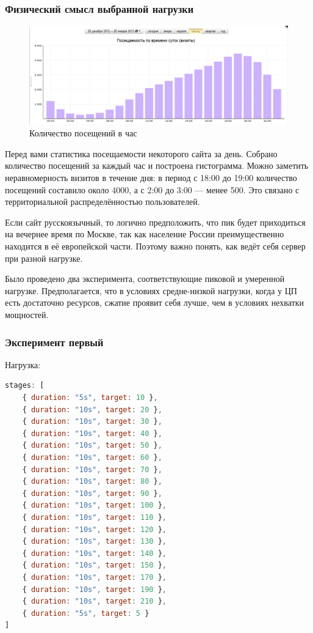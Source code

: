 \documentclass[12pt]{article}
\begin{document}
\subsubsection{Физический смысл выбранной нагрузки}

\begin{figure}[H]
    \centering
    \includegraphics[width=1\textwidth]{../images/pedsovet.png}
    \caption{Количество посещений в час}
\end{figure}

Перед вами статистика посещаемости некоторого сайта за день. Собрано количество посещений за каждый час и построена гистограмма.
Можно заметить неравномерность визитов в течение дня: в период с 18:00 до 19:00 количество посещений составило около 4000,
а с 2:00 до 3:00 — менее 500. Это связано с территориальной распределённостью пользователей.

Если сайт русскоязычный, то логично предположить, что пик будет приходиться на вечернее время по Москве,
так как население России преимущественно находится в её европейской части. Поэтому важно понять, как ведёт себя сервер при разной нагрузке.

Было проведено два эксперимента, соответствующие пиковой и умеренной нагрузке.
Предполагается, что в условиях средне-низкой нагрузки, когда у ЦП есть достаточно ресурсов, сжатие проявит себя лучше, чем в условиях нехватки мощностей.

\subsubsection{Эксперимент первый}

Нагрузка:
\begin{lstlisting}[language=JavaScript]
stages: [
    { duration: "5s", target: 10 },
    { duration: "10s", target: 20 },
    { duration: "10s", target: 30 },
    { duration: "10s", target: 40 },
    { duration: "10s", target: 50 },
    { duration: "10s", target: 60 },
    { duration: "10s", target: 70 },
    { duration: "10s", target: 80 },
    { duration: "10s", target: 90 },
    { duration: "10s", target: 100 },
    { duration: "10s", target: 110 },
    { duration: "10s", target: 120 },
    { duration: "10s", target: 130 },
    { duration: "10s", target: 140 },
    { duration: "10s", target: 150 },
    { duration: "10s", target: 170 },
    { duration: "10s", target: 190 },
    { duration: "10s", target: 210 },
    { duration: "5s", target: 5 }
]
\end{lstlisting}
\end{document}
